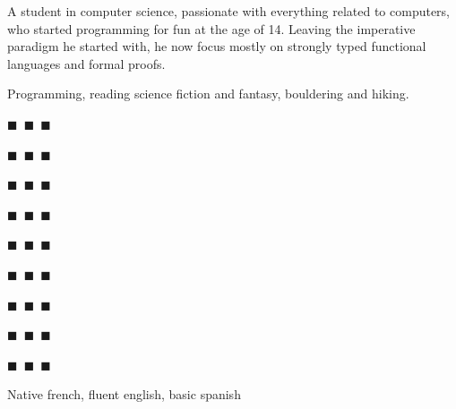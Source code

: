 \documentclass[a4paper,11pt]{extarticle}
\newcommand{\skdabb} {\colorbox{ForestGreen!80!white}{\color{skcol}$\blacksquare$~\color{noskcol}$\blacksquare$~\color{noskcol}$\blacksquare$}}
\newcommand{\skmore} {\colorbox{ForestGreen!80!white}{\color{skcol}$\blacksquare$~\color{skcol}$\blacksquare$~\color{noskcol}$\blacksquare$}}
\newcommand{\skexp}  {\colorbox{ForestGreen!80!white}{\color{skcol}$\blacksquare$~\color{skcol}$\blacksquare$~\color{skcol}$\blacksquare$}}
\begin{document}
\begin{minipage}[c]{0.35\linewidth}
\begin{tcolorbox}
        \vspace{0.3cm}

        A student in computer science, passionate with everything related to
        computers, who started programming for fun at the age of 14. Leaving
        the imperative paradigm he started with, he now focus mostly on
        strongly typed functional languages and formal proofs.

        \vspace{0.3cm}

        Programming, reading science fiction and fantasy, bouldering and hiking.

        \vspace{0.3cm}
        \begin{description}\setlength{\itemsep}{0em}
          \item[C++]\hfill\skexp
          \item[Haskell]\hfill\skexp
          \item[\LaTeX]\hfill\skexp
          \item[Linux]\hfill\skexp
          \item[Coq]\hfill\skmore
          \item[Prolog]\hfill\skmore
          \item[Nix]\hfill\skmore
          \item[OCaml]\hfill\skdabb
          \item[Python]\hfill\skdabb
        \end{description}

        \vspace{0cm}

        Native french, fluent english, basic spanish


    \end{tcolorbox}\end{minipage}
    \hfill
\end{document}
